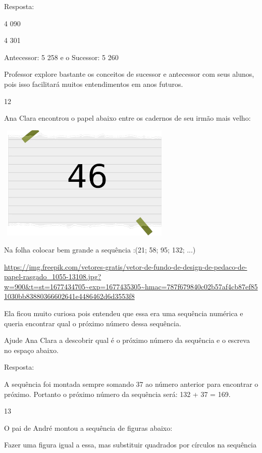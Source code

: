 Resposta:

\begin{escolha}

\item
  4 090
\item
  4 301
\item
  Antecessor: 5 258 e o Sucessor: 5 260
\end{escolha}

Professor explore bastante os conceitos de sucessor e antecessor com
seus alunos, pois isso facilitará muitos entendimentos em anos futuros.

\num{12}

Ana Clara encontrou o papel abaixo entre os cadernos de seu irmão mais
velho:

\includegraphics[width=3.30833in,height=2.17391in]{media/image2.png}

Na folha colocar bem grande a sequência :(21; 58; 95; 132; ...)

\url{https://img.freepik.com/vetores-gratis/vetor-de-fundo-de-design-de-pedaco-de-papel-rasgado_1055-13108.jpg?w=900\&t=st=1677434705~exp=1677435305~hmac=787f679840c02b57af4cb87ef851030bb83880366602641e4486462d6d3553f8}

Ela ficou muito curiosa pois entendeu que essa era uma sequência
numérica e queria encontrar qual o próximo número dessa sequência.

Ajude Ana Clara a descobrir qual é o próximo número da sequência e o
escreva no espaço abaixo.


Resposta:

A sequência foi montada sempre somando 37 ao número anterior para
encontrar o próximo. Portanto o próximo número da sequência será: 132 +
37 = 169.

\num{13}

O pai de André montou a sequência de figuras abaixo:

Fazer uma figura igual a essa, mas substituir quadrados por círculos na
sequência

